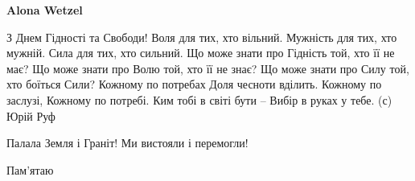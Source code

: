 \begin{itemize}
\textbf{Alona Wetzel} 

\obeycr
З Днем Гідності та Свободи!
Воля для тих, хто вільний.
Мужність для тих, хто мужній.
Сила для тих, хто сильний.
Що може знати про Гідність той, хто її не має?
Що може знати про Волю той, хто її не знає?
Що може знати про Силу той, хто боїться Сили?
Кожному по потребах Доля чесноти вділить.
Кожному по заслузі,
Кожному по потребі.
Ким тобі в світі бути –
Вибір в руках у тебе.
(с) Юрій Руф
\restorecr

Палала Земля і Граніт! Ми вистояли і перемогли!

Пам'ятаю


\end{itemize} %
